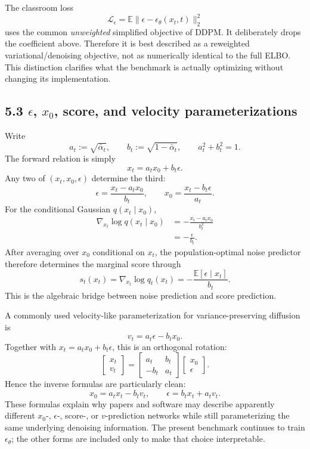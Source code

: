 \documentclass[11pt]{article}
\newcommand{\E}{\mathbb{E}}
\begin{document}
The classroom loss
\[
 \mathcal L_\epsilon
 =\E\|\epsilon-\epsilon_\theta(x_t,t)\|_2^2
\]
uses the common \emph{unweighted} simplified objective of DDPM. It deliberately
drops the coefficient above. Therefore it is best described as a reweighted
variational/denoising objective, not as numerically identical to the full ELBO.
This distinction clarifies what the benchmark is actually optimizing without
changing its implementation.

\subsection*{5.3 $\epsilon$, $x_0$, score, and velocity parameterizations}

Write
\[
 a_t:=\sqrt{\bar\alpha_t},\qquad
 b_t:=\sqrt{1-\bar\alpha_t},\qquad
 a_t^2+b_t^2=1.
\]
The forward relation is simply
\[
 x_t=a_tx_0+b_t\epsilon.
\]
Any two of $(x_t,x_0,\epsilon)$ determine the third:
\[
 \boxed{\quad
 \epsilon=\frac{x_t-a_tx_0}{b_t},\qquad
 x_0=\frac{x_t-b_t\epsilon}{a_t}.
 \quad}
\]
For the conditional Gaussian $q(x_t\mid x_0)$,
\begin{align*}
 \nabla_{x_t}\log q(x_t\mid x_0)
 &=-\frac{x_t-a_tx_0}{b_t^2}\\
 &=-\frac{\epsilon}{b_t}.
\end{align*}
After averaging over $x_0$ conditional on $x_t$, the population-optimal noise
predictor therefore determines the marginal score through
\[
 s_t(x_t)=\nabla_{x_t}\log q_t(x_t)
 =-\frac{\E[\epsilon\mid x_t]}{b_t}.
\]
This is the algebraic bridge between noise prediction and score prediction.

A commonly used velocity-like parameterization for variance-preserving
diffusion is \cite{salimans2022distill}
\[
 v_t=a_t\epsilon-b_tx_0.
\]
Together with $x_t=a_tx_0+b_t\epsilon$, this is an orthogonal rotation:
\[
 \begin{bmatrix}x_t\\v_t\end{bmatrix}
 =
 \begin{bmatrix}a_t&b_t\\-b_t&a_t\end{bmatrix}
 \begin{bmatrix}x_0\\\epsilon\end{bmatrix}.
\]
Hence the inverse formulas are particularly clean:
\[
 \boxed{
 x_0=a_tx_t-b_tv_t,\qquad
 \epsilon=b_tx_t+a_tv_t.
 }
\]
These formulas explain why papers and software may describe apparently
different $x_0$-, $\epsilon$-, score-, or $v$-prediction networks while still
parameterizing the same underlying denoising information. The present benchmark
continues to train $\epsilon_\theta$; the other forms are included only to make
that choice interpretable.
\end{document}
